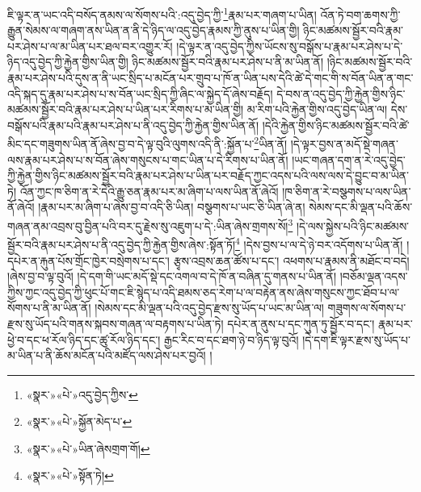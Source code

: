 ཇི་ལྟར་ན་ཡང་འདི་བསོད་ནམས་ལ་སོགས་པའི་:འདུ་བྱེད་ཀྱི་\footnote{«སྣར་»«པེ་»འདུ་བྱེད་ཀྱིས་}རྣམ་པར་གཞག་པ་ཡིན། འོན་ཏེ་བག་ཆགས་ཀྱི་རྒྱུན་སེམས་ལ་གཞག་ནས་ཡིན་ན་ནི་དེ་ཉིད་ལ་འདུ་བྱེད་རྣམས་ཀྱི་ནུས་པ་ཡིན་གྱི། ཉིང་མཚམས་སྦྱོར་བའི་རྣམ་པར་ཤེས་པ་ལ་མ་ཡིན་པར་ཐལ་བར་འགྱུར་རོ། །དེ་ལྟར་ན་འདུ་བྱེད་ཀྱིས་ཡོངས་སུ་བསྒོས་པ་རྣམ་པར་ཤེས་པ་དེ་ཉིད་འདུ་བྱེད་ཀྱི་རྐྱེན་གྱིས་ཡིན་གྱི། ཉིང་མཚམས་སྦྱོར་བའི་རྣམ་པར་ཤེས་པ་ནི་མ་ཡིན་ནོ། །ཉིང་མཚམས་སྦྱོར་བའི་རྣམ་པར་ཤེས་པའི་དུས་ན་ནི་ཡང་སྲིད་པ་མངོན་པར་གྲུབ་པ་ཁོ་ན་ཡིན་པས་དེའི་ཚེ་དེ་གང་གི་ས་བོན་ཡིན་ན་གང་འདི་སྐད་དུ་རྣམ་པར་ཤེས་པ་ས་བོན་ཡང་སྲིད་ཀྱི་ཞིང་ལ་སྐྱེད་དོ་ཞེས་བརྗོད། དེ་བས་ན་འདུ་བྱེད་ཀྱི་རྐྱེན་གྱིས་ཉིང་མཚམས་སྦྱོར་བའི་རྣམ་པར་ཤེས་པ་ཡིན་པར་རིགས་པ་མ་ཡིན་གྱི། མ་རིག་པའི་རྐྱེན་གྱིས་འདུ་བྱེད་ཡིན་ལ། དེས་བསྒོས་པའི་རྣམ་པའི་རྣམ་པར་ཤེས་པ་ནི་འདུ་བྱེད་ཀྱི་རྐྱེན་གྱིས་ཡིན་ནོ། །དེའི་རྐྱེན་གྱིས་ཉིང་མཚམས་སྦྱོར་བའི་ཚེ་མིང་དང་གཟུགས་ཡིན་ནོ་ཞེས་བྱ་བ་དེ་ལྟ་བུའི་ལུགས་འདི་ནི་:སྐྱོན་པ་\footnote{«སྣར་»«པེ་»སྐྱོན་མེད་པ་}ཡིན་ནོ། །དེ་ལྟར་བྱས་ན་མདོ་སྡེ་གཞན་ལས་རྣམ་པར་ཤེས་པ་ས་བོན་ཞེས་གསུངས་པ་གང་ཡིན་པ་དེ་རིགས་པ་ཡིན་ནོ། །ཡང་གཞན་དག་ན་རེ་འདུ་བྱེད་ཀྱི་རྐྱེན་གྱིས་ཉིང་མཚམས་སྦྱོར་བའི་རྣམ་པར་ཤེས་པ་ཡིན་པར་བརྗོད་ཀྱང་འདས་པའི་ལས་ལས་དེ་བྱུང་བ་མ་ཡིན་ཏེ། འོན་ཀྱང་ཁ་ཅིག་ན་རེ་དེའི་རྒྱུ་ཅན་རྣམ་པར་མ་ཞིག་པ་ལས་ཡིན་ནོ་ཞེའོ། །ཁ་ཅིག་ན་རེ་བསྩགས་པ་ལས་ཡིན་ནོ་ཞེའོ། །རྣམ་པར་མ་ཞིག་པ་ཞེས་བྱ་བ་འདི་ཅི་ཡིན། བསྩགས་པ་ཡང་ཅི་ཡིན་ཞེ་ན། སེམས་དང་མི་ལྡན་པའི་ཆོས་གཞན་ནམ་འབྲས་བུ་བྱིན་པའི་བར་དུ་རྗེས་སུ་འཇུག་པ་དེ་:ཡིན་ཞེས་གྲགས་སོ།\footnote{«སྣར་»«པེ་»ཡིན་ཞེསགྲག་གོ།} །དེ་ལས་སྐྱེས་པའི་ཉིང་མཚམས་སྦྱོར་བའི་རྣམ་པར་ཤེས་པ་ནི་འདུ་བྱེད་ཀྱི་རྐྱེན་གྱིས་ཞེས་:སྟོན་ཏོ།\footnote{«སྣར་»«པེ་»སྟོན་ཏེ།} །དེས་བྱས་པ་ལ་དེ་ཉེ་བར་འདོགས་པ་ཡིན་ནོ། །དཔེར་ན་རྐུན་པོས་གྲོང་ཁྱེར་བསྲེགས་པ་དང་། རྩྭས་འབྲས་ཆན་ཚོས་པ་དང་། འཕགས་པ་རྣམས་ནི་མཐོང་བ་བདེ། །ཞེས་བྱ་བ་ལྟ་བུའོ། །དེ་དག་གི་ཡང་མདོ་སྡེ་དང་འགལ་བ་དེ་ཁོ་ན་བཞིན་དུ་གནས་པ་ཡིན་ནོ། །བཅོམ་ལྡན་འདས་ཀྱིས་ཀྱང་འདུ་བྱེད་ཀྱི་ཕུང་པོ་གང་ཇི་སྙེད་པ་འདི་ཐམས་ཅད་རེག་པ་ལ་བརྟེན་ནས་ཞེས་གསུངས་ཀྱང་ཐོབ་པ་ལ་སོགས་པ་ནི་མ་ཡིན་ནོ། །སེམས་དང་མི་ལྡན་པའི་འདུ་བྱེད་རྫས་སུ་ཡོད་པ་ཡང་མ་ཡིན་ལ། གཟུགས་ལ་སོགས་པ་རྫས་སུ་ཡོད་པའི་གནས་སྐབས་གཞན་ལ་བརྟགས་པ་ཡིན་ཏེ། དཔེར་ན་ནུས་པ་དང་ཀུན་ཏུ་སྦྱོར་བ་དང་། རྣམ་པར་ཕྱེ་བ་དང་ཕ་རོལ་ཉིད་དང་ཚུ་རོལ་ཉིད་དང་། རྒྱང་རིང་བ་དང་ཐག་ཉེ་བ་ཉིད་ལྟ་བུའོ། །དེ་དག་ཇི་ལྟར་རྫས་སུ་ཡོད་པ་མ་ཡིན་པ་ནི་ཆོས་མངོན་པའི་མཛོད་ལས་ཤེས་པར་བྱའོ། །
